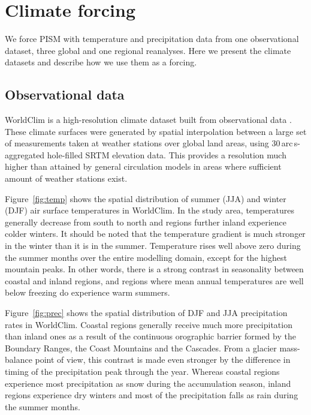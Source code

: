 \section{Climate forcing}
\label{sec:climate}

We force PISM with temperature and precipitation data from one observational dataset, three global and one regional reanalyses. Here we present the climate datasets and describe how we use them as a forcing.

\subsection{Observational data}

WorldClim is a high-resolution climate dataset built from observational data \citep{data:worldclim}. These climate surfaces were generated by spatial interpolation between a large set of measurements taken at weather stations over global land areas, using 30\,arc\,s-aggregated hole-filled SRTM elevation data. This provides a resolution much higher than attained by general circulation models in areas where sufficient amount of weather stations exist.

Figure~\ref{fig:temp} shows the spatial distribution of summer (JJA) and winter (DJF) air surface temperatures in WorldClim. In the study area, temperatures generally decrease from south to north and regions further inland experience colder winters. It should be noted that the temperature gradient is much stronger in the winter than it is in the summer. Temperature rises well above zero during the summer months over the entire modelling domain, except for the highest mountain peaks. In other words, there is a strong contrast in seasonality between coastal and inland regions, and regions where mean annual temperatures are well below freezing do experience warm summers.

Figure~\ref{fig:prec} shows the spatial distribution of DJF and JJA precipitation rates in WorldClim. Coastal regions generally receive much more precipitation than inland ones as a result of the continuous orographic barrier formed by the Boundary Ranges, the Coast Mountains and the Cascades. From a glacier mass-balance point of view, this contrast is made even stronger by the difference in timing of the precipitation peak through the year. Whereas coastal regions experience most precipitation as snow during the accumulation season, inland regions experience dry winters and most of the precipitation falls as rain during the summer months.

